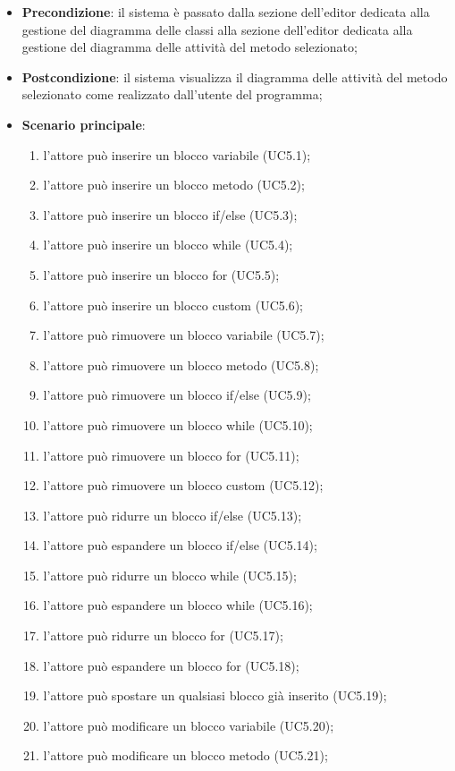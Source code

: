\begin{itemize}
\begin{itemize}
\begin{itemize}
\begin{itemize}
\begin{itemize}
	\item \textbf{Precondizione}: il sistema è passato dalla sezione dell'editor dedicata alla gestione del diagramma delle classi alla sezione dell'editor dedicata alla gestione del diagramma delle attività del metodo selezionato;
	\item \textbf{Postcondizione}: il sistema visualizza il diagramma delle attività del metodo selezionato come realizzato dall'utente del programma;
	\item \textbf{Scenario principale}:
	\begin{enumerate}
		\item l'attore può inserire un blocco variabile (UC5.1);
		\item l'attore può inserire un blocco metodo (UC5.2);
		\item l'attore può inserire un blocco if/else (UC5.3);
		\item l'attore può inserire un blocco while (UC5.4);
		\item l'attore può inserire un blocco for (UC5.5);
		\item l'attore può inserire un blocco custom (UC5.6);
		\item l'attore può rimuovere un blocco variabile (UC5.7);
		\item l'attore può rimuovere un blocco metodo (UC5.8);
		\item l'attore può rimuovere un blocco if/else (UC5.9);
		\item l'attore può rimuovere  un blocco while (UC5.10);
		\item l'attore può rimuovere un blocco for (UC5.11);
		\item l'attore può rimuovere un blocco custom (UC5.12);
		\item l'attore può ridurre un blocco if/else (UC5.13);
		\item l'attore può espandere un blocco if/else (UC5.14);
		\item l'attore può ridurre un blocco while (UC5.15);
		\item l'attore può espandere un blocco while (UC5.16);
		\item l'attore può ridurre un blocco for (UC5.17);
		\item l'attore può espandere un blocco for (UC5.18);
		\item l'attore può spostare un qualsiasi blocco già inserito (UC5.19);
		\item l'attore può modificare un blocco variabile (UC5.20);
		\item l'attore può modificare un blocco metodo (UC5.21);

\end{enumerate}
\end{itemize}
\end{itemize}
\end{itemize}
\end{itemize}
\end{itemize}
